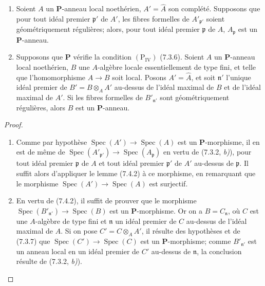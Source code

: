 \begin{corollary}[7.4.3]
\label{IV.2.s7.4.3-fr}
\begin{enumerate}
\item[\emph{(i)}] Soient $A$ un $\boldsymbol P$-anneau local noethérien,
$A'=\widehat A$ son complété. Supposons que pour tout idéal premier
$\mathfrak p'$ de $A'$, les fibres formelles de $A'_{\mathfrak p'}$ soient
géométriquement régulières; alors, pour tout idéal premier $\mathfrak p$ de
$A$, $A_{\mathfrak p}$ est un $\boldsymbol P$-anneau.
\item[\emph{(ii)}] Supposons que $\boldsymbol P$ vérifie la condition
$(\mathrm P_{\mathrm{IV}})$ \textup{(7.3.6)}. Soient $A$ un $\boldsymbol P$-anneau
local noethérien, $B$ une $A$-algèbre locale essentiellement de type fini,
et telle que l'homomorphisme $A\to B$ soit local. Posons $A'=\widehat A$,
et soit $\mathfrak n'$ l'unique idéal premier de
$B'=B\otimes_A A'$ au-dessus de l'idéal maximal de $B$ et de l'idéal
maximal de $A'$. Si les fibres formelles de $B'_{\mathfrak n'}$ sont
géométriquement régulières, alors $B$ est un $\boldsymbol P$-anneau.
\end{enumerate}
\end{corollary}

\begin{proof}
\begin{enumerate}
\item[(i)] Comme par hypothèse
$\operatorname{Spec}(A')\to\operatorname{Spec}(A)$ est un
$\boldsymbol P$-morphisme, il en est de même de
$\operatorname{Spec}(A'_{\mathfrak p'})\to
\operatorname{Spec}(A_{\mathfrak p})$ en vertu de (7.3.2, \emph{b)}), pour tout
idéal premier $\mathfrak p$ de $A$ et tout idéal premier $\mathfrak p'$ de
$A'$ au-dessus de $\mathfrak p$. Il suffit alors d'appliquer le lemme
(7.4.2) à ce morphisme, en remarquant que le morphisme
$\operatorname{Spec}(A')\to\operatorname{Spec}(A)$ est surjectif.
\item[(ii)] En vertu de (7.4.2), il suffit de prouver que le morphisme
$\operatorname{Spec}(B'_{\mathfrak n'})\to\operatorname{Spec}(B)$ est un
$\boldsymbol P$-morphisme. Or on a $B=C_{\mathfrak n}$, où $C$ est une
$A$-algèbre de type fini et $\mathfrak n$ un idéal premier de $C$ au-dessus
de l'idéal maximal de $A$. Si on pose $C'=C\otimes_A A'$, il résulte des
hypothèses et de (7.3.7) que
$\operatorname{Spec}(C')\to\operatorname{Spec}(C)$ est un
$\boldsymbol P$-morphisme; comme $B'_{\mathfrak n'}$ est un anneau local en
un idéal premier de $C'$ au-dessus de $\mathfrak n$, la conclusion résulte
de (7.3.2, \emph{b)}).
\end{enumerate}
\end{proof}

